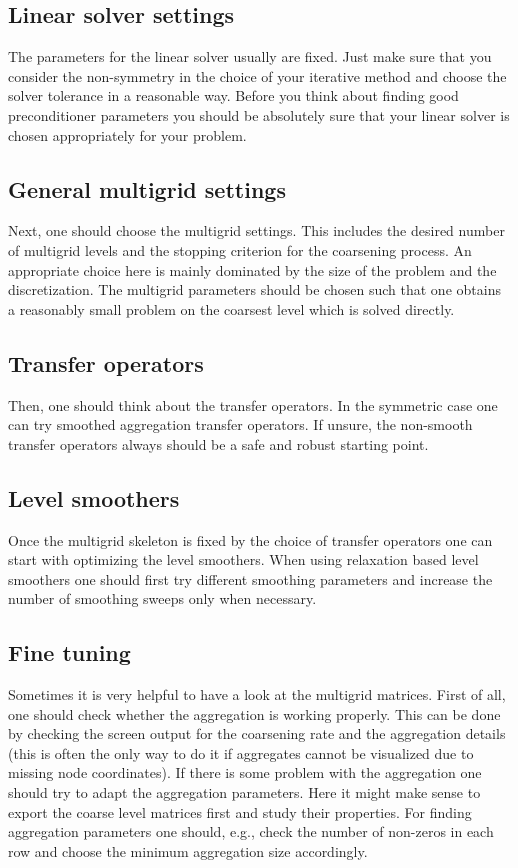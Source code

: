 \documentclass[10pt,fleqn]{book}
\begin{document}
\subsection{Linear solver settings}
The parameters for the linear solver usually are fixed. Just make sure that you consider the non-symmetry in the choice of your iterative method and choose the solver tolerance in a reasonable way. Before you think about finding good preconditioner parameters you should be absolutely sure that your linear solver is chosen appropriately for your problem.

\subsection{General multigrid settings}
Next, one should choose the multigrid settings. This includes the desired number of multigrid levels and the stopping criterion for the coarsening process. An appropriate choice here is mainly dominated by the size of the problem and the discretization. The multigrid parameters should be chosen such that one obtains a reasonably small problem on the coarsest level which is solved directly.

\subsection{Transfer operators}
Then, one should think about the transfer operators. In the symmetric case one can try smoothed aggregation transfer operators. If unsure, the non-smooth transfer operators always should be a safe and robust starting point.

\subsection{Level smoothers}
Once the multigrid skeleton is fixed by the choice of transfer operators one can start with optimizing the level smoothers. When using relaxation based level smoothers one should first try different smoothing parameters and increase the number of smoothing sweeps only when necessary.

\subsection{Fine tuning}
Sometimes it is very helpful to have a look at the multigrid matrices.
First of all, one should check whether the aggregation is working properly. This can be done by checking the screen output for the coarsening rate and the aggregation details (this is often the only way to do it if aggregates cannot be visualized due to missing node coordinates). If there is some problem with the aggregation one should try to adapt the aggregation parameters. Here it might make sense to export the coarse level matrices first and study their properties. For finding aggregation parameters one should, e.g., check the number of non-zeros in each row and choose the minimum aggregation size accordingly.
\end{document}
